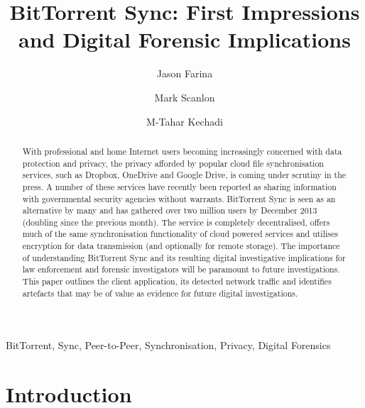 \documentclass[final,5p,times,twocolumn]{elsarticle}
\begin{document}
\begin{frontmatter}

\title{BitTorrent Sync: First Impressions and Digital Forensic Implications}


\author{Jason Farina}
\author{Mark Scanlon}
\author{M-Tahar Kechadi}
\address{UCD School of Computer Science and Informatics,\\
		University College Dublin, Dublin 4, Ireland.}



\begin{abstract}
With professional and home Internet users becoming increasingly concerned with data protection and privacy, the privacy afforded by popular cloud file synchronisation services, such as Dropbox, OneDrive and Google Drive, is coming under scrutiny in the press. A number of these services have recently been reported as sharing information with governmental security agencies without warrants. BitTorrent Sync is seen as an alternative by many and has gathered over two million users by December 2013 (doubling since the previous month). The service is completely decentralised, offers much of the same synchronisation functionality of cloud powered services and utilises encryption for data transmission (and optionally for remote storage). The importance of understanding BitTorrent Sync and its resulting digital investigative implications for law enforcement and forensic investigators will be paramount to future investigations. This paper outlines the client application, its detected network traffic and identifies artefacts that may be of value as evidence for future digital investigations.
\end{abstract}

\begin{keyword}


BitTorrent, Sync, Peer-to-Peer, Synchronisation, Privacy, Digital Forensics
\end{keyword}

\end{frontmatter}



\section{Introduction}
\label{introduction}
\end{document}
